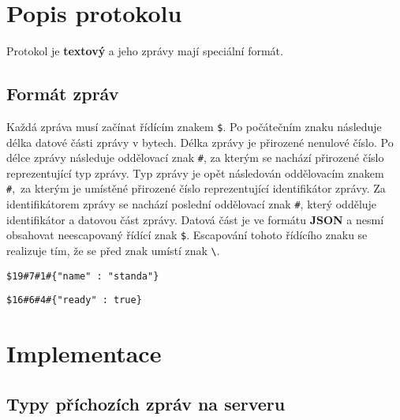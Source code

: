 \documentclass[12pt, a4paper]{article}
\let\oldsection\section
\renewcommand\section{\clearpage\oldsection}
\begin{document}
   	    \section{Popis protokolu}
	    Protokol je \textbf{textový} a jeho zprávy mají speciální formát.
	    \subsection{Formát zpráv}
		Každá zpráva musí začínat řídícím znakem \texttt{\$}. Po počátečním znaku následuje délka datové části zprávy v bytech. Délka zprávy je přirozené nenulové číslo. Po délce zprávy následuje oddělovací znak \texttt{\#}, za kterým se nachází přirozené číslo reprezentující typ zprávy. Typ zprávy je opět následován oddělovacím znakem \texttt{\#},\ za kterým je umístěné přirozené číslo reprezentující identifikátor zprávy. Za identifikátorem zprávy se nachází poslední oddělovací znak \texttt{\#}, který odděluje identifikátor a datovou část zprávy. Datová část je ve formátu \textbf{JSON} a nesmí obsahovat neescapovaný řídící znak \texttt{\$}. Escapování tohoto řídícího znaku se realizuje tím, že se před znak umístí znak \texttt{\textbackslash}.
		
        \begin{lstlisting}[caption={Zpráva protokolu, která je typu \texttt{7} a je identifikována číslem \texttt{1}. Její datová část je dlouhá 19 bytů.},captionpos=b]
		$19#7#1#{"name" : "standa"}
		\end{lstlisting}
			
        \begin{lstlisting}[caption={Zpráva protokolu, která je typu \texttt{6} a je identifikována číslem \texttt{4}. Její datová část je dlouhá 16 bytů.},captionpos=b]
		$16#6#4#{"ready" : true}
		\end{lstlisting}
	

    \section{Implementace}
	    \subsection{Typy příchozích zpráv na serveru}		    
	    
\end{document}
